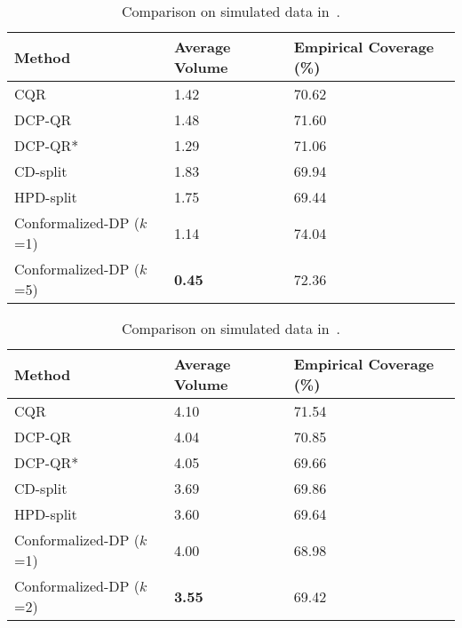\begin{table}[H]
    \centering
    \caption{Comparison on simulated data in~\citet{romano2019conformalized}.}
    \label{tab:conformal_results1}
    \begin{tabular}{p{5cm} p{5cm} p{5cm}}
        \toprule
        \textbf{Method} & \textbf{Average Volume} & \textbf{Empirical Coverage (\%)} \\
        \midrule
        CQR & 1.42 & 70.62 \\
        DCP-QR & 1.48 & 71.60 \\
        DCP-QR* & 1.29 & 71.06 \\
        CD-split & 1.83 & 69.94 \\
        HPD-split & 1.75 & 69.44 \\
        Conformalized-DP ($k$=1) & 1.14 & 74.04 \\
        Conformalized-DP ($k$=5) & \textbf{0.45} & 72.36 \\
        \bottomrule
    \end{tabular}
\end{table}

\begin{table}[H]
    \centering
    \caption{Comparison on simulated data in~\citet{izbicki2020flexible}.}
    \label{tab:conformal_results2}
    \begin{tabular}{p{5cm} p{5cm} p{5cm}}
        \toprule
        \textbf{Method} & \textbf{Average Volume} & \textbf{Empirical Coverage (\%)} \\
        \midrule
        CQR & 4.10 & 71.54 \\
        DCP-QR & 4.04 & 70.85 \\
        DCP-QR* & 4.05 & 69.66 \\
        CD-split & 3.69 & 69.86 \\
        HPD-split & 3.60 & 69.64 \\
        Conformalized-DP ($k$=1) & 4.00 & 68.98 \\
        Conformalized-DP ($k$=2) & \textbf{3.55} & 69.42 \\
        \bottomrule
    \end{tabular}
\end{table}

